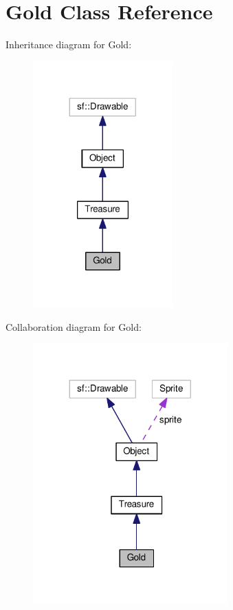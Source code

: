 \hypertarget{classGold}{\section{Gold Class Reference}
\label{classGold}
}


Inheritance diagram for Gold\+:
\nopagebreak
\begin{figure}[H]
\begin{center}
\leavevmode
\includegraphics[width=152pt]{classGold__inherit__graph}
\end{center}
\end{figure}


Collaboration diagram for Gold\+:
\nopagebreak
\begin{figure}[H]
\begin{center}
\leavevmode
\includegraphics[width=212pt]{classGold__coll__graph}
\end{center}
\end{figure}
